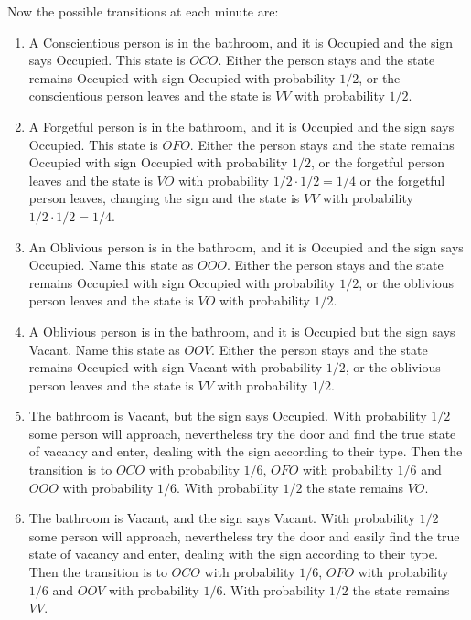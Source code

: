 \documentclass[12pt]{article}
\begin{document}
Now the possible transitions at each minute are:
\begin{enumerate}
    \item
        A Conscientious person is in the bathroom, and it is Occupied
        and the sign says Occupied.  This state is \( OCO \).  Either
        the person stays and the state remains Occupied with sign
        Occupied with probability \( 1/2 \), or the conscientious person
        leaves and the state is \( VV \) with probability \( 1/2 \).
    \item
        A Forgetful person is in the bathroom, and it is Occupied and
        the sign says Occupied.  This state is \( OFO \).  Either the
        person stays and the state remains Occupied with sign Occupied
        with probability \( 1/2 \), or the forgetful person leaves and
        the state is \( VO \) with probability \( 1/2 \cdot 1/2 = 1/4 \)
        or the forgetful person leaves, changing the sign and the state
        is \( VV \) with probability \( 1/2 \cdot 1/2 = 1/4 \).
    \item
        An Oblivious person is in the bathroom, and it is Occupied and
        the sign says Occupied.  Name this state as \( OOO \).  Either
        the person stays and the state remains Occupied with sign
        Occupied with probability \( 1/2 \), or the oblivious person
        leaves and the state is \( VO \) with probability \( 1/2 \).
    \item
        A Oblivious person is in the bathroom, and it is Occupied but
        the sign says Vacant.  Name this state as \( OOV \).  Either the
        person stays and the state remains Occupied with sign Vacant
        with probability \( 1/2 \), or the oblivious person leaves and
        the state is \( VV \) with probability \( 1/2 \).
    \item
        The bathroom is Vacant, but the sign says Occupied.  With
        probability \( 1/2 \) some person will approach, nevertheless
        try the door and find the true state of vacancy and enter,
        dealing with the sign according to their type.  Then the
        transition is to \( OCO \) with probability \( 1/6 \), \( OFO \)
        with probability \( 1/6 \) and \( OOO \) with probability \( 1/6
        \).  With probability \( 1/2 \) the state remains \( VO \).
    \item
        The bathroom is Vacant, and the sign says Vacant.  With
        probability \( 1/2 \) some person will approach, nevertheless
        try the door and easily find the true state of vacancy and
        enter, dealing with the sign according to their type.  Then the
        transition is to \( OCO \) with probability \( 1/6 \), \( OFO \)
        with probability \( 1/6 \) and \( OOV \) with probability \( 1/6
        \).  With probability \( 1/2 \) the state remains \( VV \).
\end{enumerate}
\end{document}
